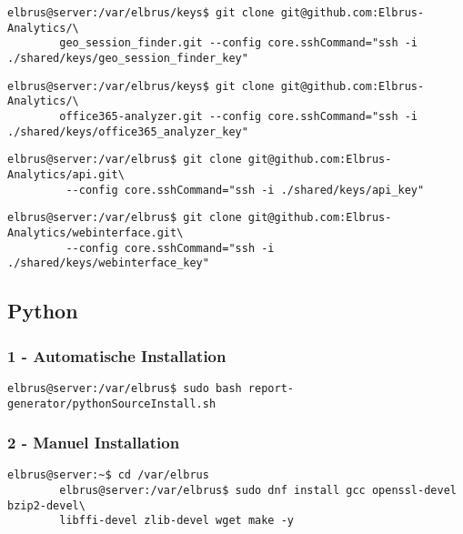 \documentclass{article}
\begin{document}
	\lstset{style=commands}
	\begin{lstlisting}[caption={Clonen der 'geo session finders' Software.}]
		elbrus@server:/var/elbrus/keys$ git clone git@github.com:Elbrus-Analytics/\
		geo_session_finder.git --config core.sshCommand="ssh -i ./shared/keys/geo_session_finder_key"
	\end{lstlisting}

	\lstset{style=commands}
	\begin{lstlisting}[caption={Clonen der 'office365-analyzer' Software.}]
		elbrus@server:/var/elbrus/keys$ git clone git@github.com:Elbrus-Analytics/\
		office365-analyzer.git --config core.sshCommand="ssh -i ./shared/keys/office365_analyzer_key"
	\end{lstlisting}
	
	\lstset{style=commands}
	\begin{lstlisting}[caption={Clonen der API Software.}]
		elbrus@server:/var/elbrus$ git clone git@github.com:Elbrus-Analytics/api.git\
		 --config core.sshCommand="ssh -i ./shared/keys/api_key"
	\end{lstlisting}

	\lstset{style=commands}
	\begin{lstlisting}[caption={Clonen der Packet-Importer Software}]
		elbrus@server:/var/elbrus$ git clone git@github.com:Elbrus-Analytics/webinterface.git\
		 --config core.sshCommand="ssh -i ./shared/keys/webinterface_key"
	\end{lstlisting}
	\newpage
	
	\subsection{Python}
	\subsubsection{1 - Automatische Installation}

	\lstset{style=commands}
	\begin{lstlisting}[caption={Ausführen des 'pythonSourceInstall.sh' Scripts.}]
		elbrus@server:/var/elbrus$ sudo bash report-generator/pythonSourceInstall.sh
	\end{lstlisting}
	
	\subsubsection{2 - Manuel Installation}
	
	\lstset{style=commands}
	\begin{lstlisting}[caption={Installieren von benötigten Packeten und Abhängigkeiten.}]
		elbrus@server:~$ cd /var/elbrus
		elbrus@server:/var/elbrus$ sudo dnf install gcc openssl-devel bzip2-devel\
		libffi-devel zlib-devel wget make -y
	\end{lstlisting}
	
\end{document}
